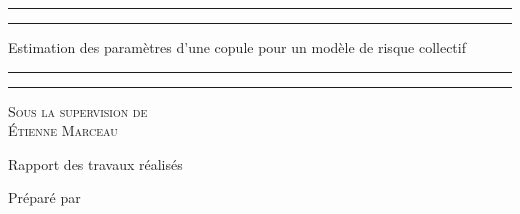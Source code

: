 \documentclass{article}
\begin{document}
	
		\begin{titlepage}
		\centering %
		
		\scshape %
		
		\vspace*{7\baselineskip} %
		
		
		\rule{\textwidth}{1.6pt}\vspace*{-\baselineskip}\vspace*{2pt} %
		\rule{\textwidth}{0.4pt} %
		
		\vspace{0.75\baselineskip} %
		
		{\LARGE Estimation des paramètres d'une copule pour un modèle de risque collectif \\} %
		\vspace{0.75\baselineskip} %
		
		\rule{\textwidth}{0.4pt}\vspace*{-\baselineskip}\vspace{3.2pt} %
		\rule{\textwidth}{1.6pt} %
		
		\vspace{3\baselineskip} %
		
		{\scshape\Large Sous la supervision de \\Étienne Marceau\\} %
		
		\vspace*{3\baselineskip}
		
		Rapport des travaux réalisés  \\%
		
		\vspace*{3\baselineskip} %
		
		
		Préparé par
		
		\vspace{0.5\baselineskip} %
		

\end{titlepage}
\end{document}
